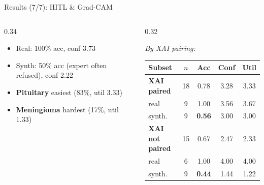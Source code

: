 \documentclass[aspectratio=169]{beamer}
\begin{document}
\begin{frame}{Results (7/7): HITL \& Grad-CAM}
\begin{columns}[T]
\begin{column}{0.34\textwidth}
      \vspace{0.2em}
      \begin{center}
      \begin{minipage}{0.92\linewidth}
      {%
      \begin{block}{}\tiny
        \begin{itemize}\itemsep1pt\setlength{\leftmargini}{1em}
          \item Real: 100\% acc, conf 3.73
          \item Synth: 50\% acc (expert often refused), conf 2.22
          \item \textbf{Pituitary} easiest (83\%, util 3.33)
          \item \textbf{Meningioma} hardest (17\%, util 1.33)
        \end{itemize}
      \end{block}}
      \end{minipage}
      \end{center}
    \end{column}
    \begin{column}{0.32\textwidth}
      \begin{minipage}[t][2.9cm][t]{\linewidth}
      \textit{\scriptsize By XAI pairing:}\\[3pt]
      \tiny
      \begin{tabular*}{\linewidth}{@{\extracolsep{\fill}}lcccc}
        \toprule
        Subset & $n$ & Acc & Conf & Util \\
        \midrule
        \textbf{XAI paired}     & 18 & 0.78 & 3.28 & 3.33 \\
        \;real                  & 9  & 1.00 & 3.56 & 3.67 \\
        \;synth.                & 9  & \textbf{0.56} & 3.00 & 3.00 \\
        \textbf{XAI not paired} & 15 & 0.67 & 2.47 & 2.33 \\
        \;real                  & 6  & 1.00 & 4.00 & 4.00 \\
        \;synth.                & 9  & \textbf{0.44} & 1.44 & 1.22 \\
        \bottomrule
      \end{tabular*}
      \end{minipage}


\end{column}
\end{columns}
\end{frame}
\end{document}
